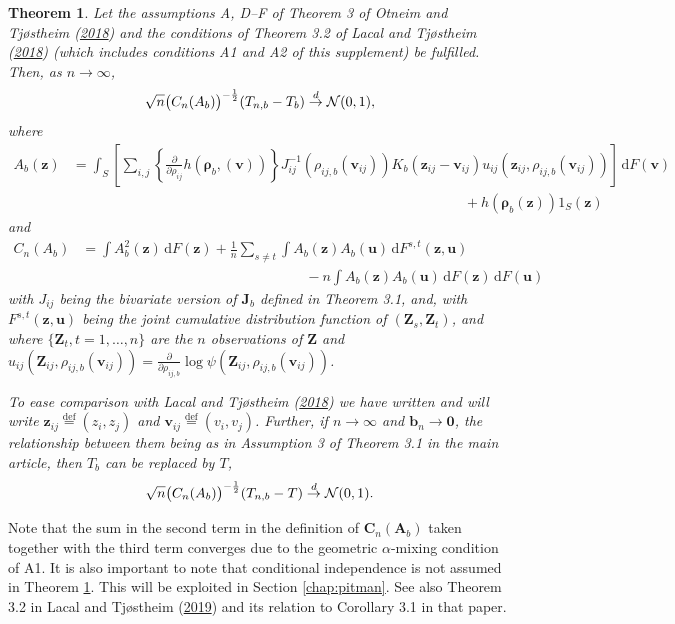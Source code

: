 \documentclass[
  12pt,
  letterpaper]{article}
\newtheorem{thm}{Theorem}[section]
\numberwithin{equation}{section}
\newcommand{\Z}{\bm{Z}}
\newcommand{\z}{\bm{z}}
\newcommand{\fv}{\bm{v}}
\newcommand{\fu}{\bm{u}}
\newcommand{\fC}{\bm{C}}
\newcommand{\fA}{\bm{A}}
\newcommand{\J}{\bm{J}}
\newcommand{\frho}{\bm{\rho}}
\newcommand{\bb}{\bm{b}}
\newcommand{\di}{\,\textrm{d}}
\begin{document}
\begin{thm} 
Let the assumptions A, D--F of Theorem 3 of Otneim and Tjøstheim (\protect\hyperlink{ref-otneim2017conditional}{2018}) and the conditions of Theorem 3.2 of Lacal and Tjøstheim (\protect\hyperlink{ref-lacal2018estimating}{2018}) (which includes conditions A1 and A2 of this supplement) be fulfilled. Then,
as $n \to \infty$,
$$
\sqrt{n}\big(C_{n}(A_b)\big)^{-\frac{1}{2}}(T_{n,b} - T_b) \buildrel {d} \over {\to} {\cal N}(0,1),
$$
where
\begin{align*}
A_b(\z)  & = \int_{S} \left[\sum_{i,j}\left\{\frac{\partial}{\partial \rho_{ij}} h(\frho_b,(\fv))\right\}J_{ij}^{-1}(\rho_{ij,b}(\fv_{ij}))K_b(\z_{ij}- \fv_{ij})u_{ij}(\z_{ij},\rho_{ij,b}(\fv_{ij}))\right] \di F(\fv) \\
& \qquad\qquad\qquad\qquad\qquad\qquad\qquad\qquad\qquad\qquad\qquad\qquad\qquad\qquad + h(\frho_b(\z))1_S(\z)
\end{align*}
and 
\begin{align}
C_n(A_b) &= \int A_b^2(\z) \di F(\z) + \frac{1}{n}\sum_{s \neq t}\int A_b(\z)A_b(\fu) \di F^{s,t}(\z,\fu) \nonumber \\
& \qquad\qquad\qquad\qquad\qquad\qquad\qquad\qquad - n\int A_b(\z)A_b(\fu) \di F(\z) \di F(\fu)
\label{eq:t0}
\end{align}
with $J_{ij}$ being the bivariate version of $\J_b$ defined in Theorem 3.1, and, with $F^{s,t}(\z,\fu)$ being the joint cumulative distribution function of $(\Z_s,\Z_t)$, and where $\{\Z_{t}, t=1,\ldots,n\}$ are the $n$ observations of $\Z$ and $u_{ij}(\Z_{ij}, \rho_{ij,b}(\fv_{ij})) = \frac{\partial}{\partial \rho_{ij,b}}\log\psi(\Z_{ij},\rho_{ij,b}(\fv_{ij}))$. 

To ease comparison with Lacal and Tjøstheim (\protect\hyperlink{ref-lacal2018estimating}{2018}) we have written and will write $\z_{ij} \stackrel{\textrm{def}}{=} (z_i,z_j)$ and $\fv_{ij} \stackrel{\textrm{def}}{=} (v_i,v_j)$. Further, if $n \to \infty$ and $\bb_n \to \bm{0}$, the relationship between them being as in Assumption 3 of Theorem 3.1 in the main article, then $T_b$ can be replaced by $T$,
$$
\sqrt{n}\big(C_{n}(A_b)\big)^{-\frac{1}{2}}(T_{n,b} - T) \buildrel {d} \over {\to} {\cal N}(0,1).
$$
\label{thm:F2}
\end{thm}

Note that the sum in the second term in the definition of \(\fC_n(\fA_b)\) taken together with the third term converges due to the geometric \(\alpha\)-mixing condition of A1. It is also important to note that conditional independence is not assumed in Theorem \ref{thm:F2}. This will be exploited in Section \ref{chap:pitman}. See also Theorem 3.2 in Lacal and Tjøstheim (\protect\hyperlink{ref-lacal2018estimating}{2019}) and its relation to Corollary 3.1 in that paper.
\end{document}
